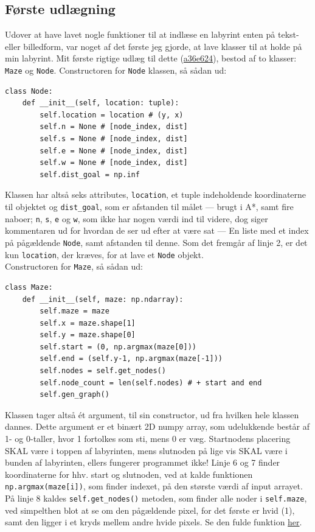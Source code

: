 \documentclass[a4paper, 12pt]{article}
\begin{document}
\subsection{Første udlægning}
Udover at have lavet nogle funktioner til at indlæse en labyrint enten på tekst- eller billedform, var noget af det første jeg gjorde, at lave klasser til at holde på min labyrint.
Mit første rigtige udlæg til dette (\href{https://github.com/Tinggaard/pathfinding/tree/a36e6247fe420194bf75fed42b19529c447c4c40}{a36e624}), bestod af to klasser: \texttt{Maze} og \texttt{Node}. Constructoren for \texttt{Node} klassen, så sådan ud:
\begin{verbatim}
class Node:
    def __init__(self, location: tuple):
        self.location = location # (y, x)
        self.n = None # [node_index, dist]
        self.s = None # [node_index, dist]
        self.e = None # [node_index, dist]
        self.w = None # [node_index, dist]
        self.dist_goal = np.inf
\end{verbatim}
Klassen har altså seks attributes, \texttt{location}, et tuple indeholdende koordinaterne til objektet og \texttt{dist\_goal}, som er afstanden til målet --- brugt i A*, samt fire naboer; \texttt{n}, \texttt{s}, \texttt{e} og \texttt{w}, som ikke har nogen værdi ind til videre, dog siger kommentaren ud for hvordan de ser ud efter at være sat --- En liste med et index på pågældende \texttt{Node}, samt afstanden til denne. Som det fremgår af linje 2, er det kun \texttt{location}, der kræves, for at lave et \texttt{Node} objekt.\\
Constructoren for \texttt{Maze}, så sådan ud:
\begin{verbatim}
class Maze:
    def __init__(self, maze: np.ndarray):
        self.maze = maze
        self.x = maze.shape[1]
        self.y = maze.shape[0]
        self.start = (0, np.argmax(maze[0]))
        self.end = (self.y-1, np.argmax(maze[-1]))
        self.nodes = self.get_nodes()
        self.node_count = len(self.nodes) # + start and end
        self.gen_graph()
\end{verbatim}
Klassen tager altså ét argument, til sin constructor, ud fra hvilken hele klassen dannes. Dette argument er et binært 2D numpy array\cite{ndarray}, som udelukkende består af 1- og 0-taller, hvor 1 fortolkes som sti, mens 0 er væg. Startnodens placering SKAL være i toppen af labyrinten, mens slutnoden på lige vis SKAL være i bunden af labyrinten, ellers fungerer programmet ikke! Linje 6 og 7 finder koordinaterne for hhv. start og slutnoden, ved at kalde funktionen \texttt{np.argmax(maze[i])}, som finder indexet, på den største værdi af input arrayet.\cite{argmax} På linje 8 kaldes \texttt{self.get\_nodes()} metoden, som finder alle noder i \texttt{self.maze}, ved simpelthen blot at se om den pågældende pixel, for det første er hvid (1), samt den ligger i et kryds mellem andre hvide pixels. Se den fulde funktion \href{https://github.com/Tinggaard/pathfinding/blob/a36e6247fe420194bf75fed42b19529c447c4c40/src/scheme.py\#L42-L70}{her}.
\end{document}

